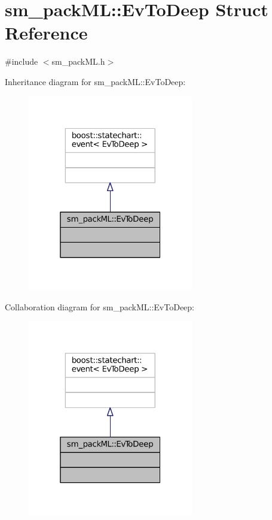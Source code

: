 \hypertarget{structsm__packML_1_1EvToDeep}{}\section{sm\+\_\+pack\+ML\+:\+:Ev\+To\+Deep Struct Reference}
\label{structsm__packML_1_1EvToDeep}


{\ttfamily \#include $<$sm\+\_\+pack\+M\+L.\+h$>$}



Inheritance diagram for sm\+\_\+pack\+ML\+:\+:Ev\+To\+Deep\+:
\nopagebreak
\begin{figure}[H]
\begin{center}
\leavevmode
\includegraphics[width=205pt]{structsm__packML_1_1EvToDeep__inherit__graph}
\end{center}
\end{figure}


Collaboration diagram for sm\+\_\+pack\+ML\+:\+:Ev\+To\+Deep\+:
\nopagebreak
\begin{figure}[H]
\begin{center}
\leavevmode
\includegraphics[width=205pt]{structsm__packML_1_1EvToDeep__coll__graph}
\end{center}
\end{figure}


